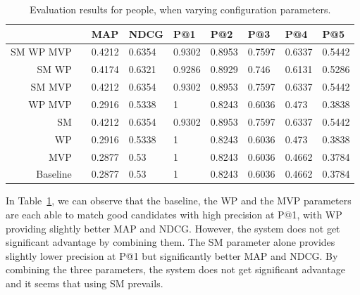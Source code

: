 \begin{table}[htb]
\centering
{}
\begin{tabular}{@{}rcl@{\hs}l@{\hs}l@{\hs}l@{\hs}l@{\hs}l@{\hs}l@{}}
\toprule
& \phantom{a} & MAP & NDCG & P@1 & P@2 & P@3 & P@4 & P@5 \\ 
\midrule

 SM WP MVP && 0.4212 & 0.6354 & 0.9302 & 0.8953 & 0.7597 & 0.6337 & 0.5442 \\ %

 SM WP && 0.4174 & 0.6321 & 0.9286 & 0.8929 & 0.746 & 0.6131 & 0.5286 \\ %

 SM MVP && 0.4212 & 0.6354 & 0.9302 & 0.8953 & 0.7597 & 0.6337 & 0.5442 \\ %

 WP MVP && 0.2916 & 0.5338 & 1 & 0.8243 & 0.6036 & 0.473 & 0.3838 \\ %

 SM && 0.4212 & 0.6354 & 0.9302 & 0.8953 & 0.7597 & 0.6337 & 0.5442 \\ %

 WP && 0.2916 & 0.5338 & 1 & 0.8243 & 0.6036 & 0.473 & 0.3838 \\ %

 MVP && 0.2877 & 0.53 & 1 & 0.8243 & 0.6036 & 0.4662 & 0.3784 \\ %

 Baseline && 0.2877 & 0.53 & 1 & 0.8243 & 0.6036 & 0.4662 & 0.3784 \\ %

\bottomrule
\end{tabular}
\caption{Evaluation results for people, when varying configuration parameters.}
\label{tab:agreement-people}
\end{table}

In Table~\ref{tab:agreement-people}, we can observe that the baseline, the WP and the MVP parameters are each able to match good candidates with high precision at P@1, with WP providing slightly better MAP and NDCG. However, the system does not get significant advantage by combining them. The SM parameter alone provides slightly lower precision at P@1 but significantly better MAP and NDCG. By combining the three parameters, the system does not get significant advantage and it seems that using SM prevails. 

